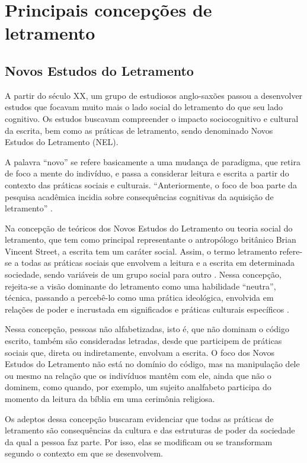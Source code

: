 \documentclass{textolivre}
\begin{document}
\section{Principais concepções de letramento}\label{sec-principais}
\subsection{Novos Estudos do Letramento}\label{sec-novos-estudos}
A partir do século XX, um grupo de estudiosos anglo-saxões passou a desenvolver
estudos que focavam muito mais o lado social do letramento do que seu lado
cognitivo. Os estudos buscavam compreender o impacto sociocognitivo e cultural
da escrita, bem como as práticas de letramento, sendo denominado Novos Estudos
do Letramento (NEL).

A palavra “novo” se refere basicamente a uma mudança de paradigma, que retira
de foco a mente do indivíduo, e passa a considerar leitura e escrita a partir
do contexto das práticas sociais e culturais. “Anteriormente, o foco de boa
parte da pesquisa acadêmica incidia sobre consequências cognitivas da aquisição
de letramento” \cite[p. 17]{street2014}.

Na concepção de teóricos dos Novos Estudos do Letramento ou teoria social do
letramento, que tem como principal representante o antropólogo britânico Brian
Vincent Street, a escrita tem um caráter social. Assim, o termo letramento
refere-se a todas as práticas sociais que envolvem a leitura e a escrita em
determinada sociedade, sendo variáveis de um grupo social para outro \cite{street2014}.
Nessa concepção, rejeita-se a visão dominante do letramento como uma
habilidade “neutra”, técnica, passando a percebê-lo como uma prática
ideológica, envolvida em relações de poder e incrustada em significados e
práticas culturais específicos \cite{street2014}.

Nessa concepção, pessoas não alfabetizadas, isto é, que não dominam o código
escrito, também são consideradas letradas, desde que participem de práticas
sociais que, direta ou indiretamente, envolvam a escrita. O foco dos Novos
Estudos do Letramento não está no domínio do código, mas na manipulação dele ou
mesmo na relação que os indivíduos mantêm com ele, ainda que não o dominem,
como quando, por exemplo, um sujeito analfabeto participa do momento da leitura
da bíblia em uma cerimônia religiosa.

Os adeptos dessa concepção buscaram evidenciar que todas as práticas de
letramento são consequências da cultura e das estruturas de poder da sociedade
da qual a pessoa faz parte. Por isso, elas se modificam ou se transformam
segundo o contexto em que se desenvolvem.
\end{document}
